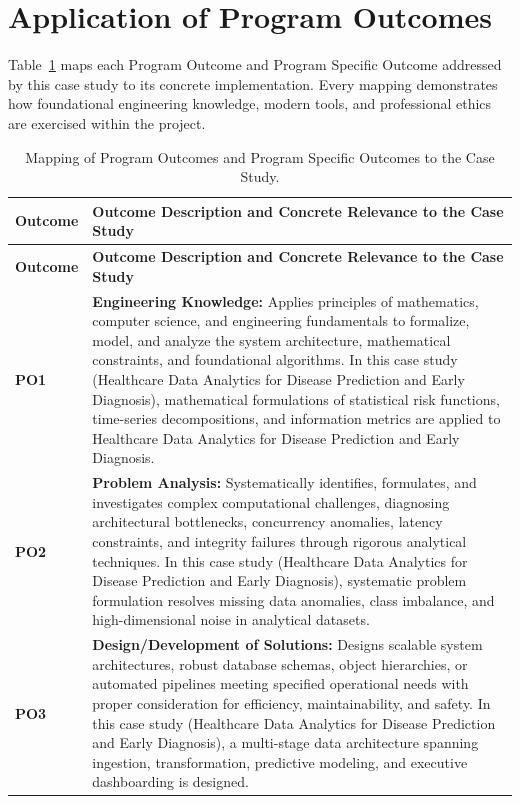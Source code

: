 \section{Application of Program Outcomes}
Table~\ref{tab:po} maps each Program Outcome and Program Specific Outcome addressed by this case study to its concrete implementation. Every mapping demonstrates how foundational engineering knowledge, modern tools, and professional ethics are exercised within the project.

{\small
\begin{longtable}{@{}>{\centering\arraybackslash}p{1.8cm} p{13.2cm}@{}}
    \caption{Mapping of Program Outcomes and Program Specific Outcomes to the Case Study.}\label{tab:po}\\
    \toprule
    \textbf{Outcome} & \textbf{Outcome Description and Concrete Relevance to the Case Study} \\
    \midrule
    \endfirsthead
    \toprule
    \textbf{Outcome} & \textbf{Outcome Description and Concrete Relevance to the Case Study} \\
    \midrule
    \endhead
\textbf{PO1} & \textbf{Engineering Knowledge:} Applies principles of mathematics, computer science, and engineering fundamentals to formalize, model, and analyze the system architecture, mathematical constraints, and foundational algorithms. In this case study (Healthcare Data Analytics for Disease Prediction and Early Diagnosis), mathematical formulations of statistical risk functions, time-series decompositions, and information metrics are applied to Healthcare Data Analytics for Disease Prediction and Early Diagnosis. \\
    \addlinespace
\textbf{PO2} & \textbf{Problem Analysis:} Systematically identifies, formulates, and investigates complex computational challenges, diagnosing architectural bottlenecks, concurrency anomalies, latency constraints, and integrity failures through rigorous analytical techniques. In this case study (Healthcare Data Analytics for Disease Prediction and Early Diagnosis), systematic problem formulation resolves missing data anomalies, class imbalance, and high-dimensional noise in analytical datasets. \\
    \addlinespace
\textbf{PO3} & \textbf{Design/Development of Solutions:} Designs scalable system architectures, robust database schemas, object hierarchies, or automated pipelines meeting specified operational needs with proper consideration for efficiency, maintainability, and safety. In this case study (Healthcare Data Analytics for Disease Prediction and Early Diagnosis), a multi-stage data architecture spanning ingestion, transformation, predictive modeling, and executive dashboarding is designed. \\

\end{longtable}}
